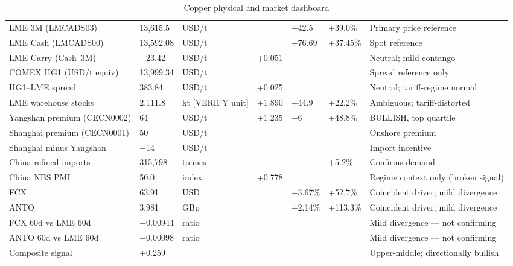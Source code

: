 \documentclass[11pt,a4paper]{article}
\begin{document}
\begin{table}[htbp]
\caption{Copper physical and market dashboard}
\footnotesize
\begin{tabularx}{\linewidth}{P{2.6cm} Q{1.7cm} P{1.5cm} Q{1.4cm} Q{1.2cm} Q{1.2cm} L}
\toprule
{} &  &  &  &  &  &  \\
\midrule
LME 3M (LMCADS03) & 13,615.5 & USD/t & & +42.5 & +39.0\% & Primary price reference \\
LME Cash (LMCADS00) & 13,592.08 & USD/t & & +76.69 & +37.45\% & Spot reference \\
LME Carry (Cash--3M) & \(-\)23.42 & USD/t & +0.051 & & & Neutral; mild contango \\
COMEX HG1 (USD/t equiv) & 13,999.34 & USD/t & & & & Spread reference only \\
HG1--LME spread & 383.84 & USD/t & +0.025 & & & Neutral; tariff-regime normal \\
LME warehouse stocks & 2,111.8 & kt [VERIFY unit] & +1.890 & +44.9 & +22.2\% & Ambiguous; tariff-distorted \\
Yangshan premium (CECN0002) & 64 & USD/t & +1.235 & \(-\)6 & +48.8\% & BULLISH, top quartile \\
Shanghai premium (CECN0001) & 50 & USD/t & & & & Onshore premium \\
Shanghai minus Yangshan & \(-\)14 & USD/t & & & & Import incentive \\
China refined imports & 315,798 & tonnes & & & +5.2\% & Confirms demand \\
China NBS PMI & 50.0 & index & +0.778 & & & Regime context only (broken signal) \\
FCX & 63.91 & USD & & +3.67\% & +52.7\% & Coincident driver; mild divergence \\
ANTO & 3,981 & GBp & & +2.14\% & +113.3\% & Coincident driver; mild divergence \\
FCX 60d vs LME 60d & \(-\)0.00944 & ratio & & & & Mild divergence --- not confirming \\
ANTO 60d vs LME 60d & \(-\)0.00098 & ratio & & & & Mild divergence --- not confirming \\
Composite signal & +0.259 & & & & & Upper-middle; directionally bullish \\
\bottomrule
\end{tabularx}
\end{table}
\end{document}
